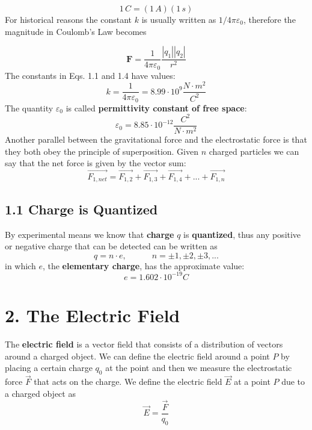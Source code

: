 \documentclass[12pt, a4paper]{article}
\begin{document}
		\begin{equation*}
			1 \, C = (1 \, A)(1 \, s)
		\end{equation*}
		For historical reasons the constant $k$ is usually written as $1/4\pi\varepsilon_0$, therefore the magnitude in Coulomb's Law becomes
		
		\begin{equation}
			\textbf{F} = \frac{1}{4\pi\varepsilon_0} \frac{|q_1||q_2|}{r^2} \tag{Coulomb's Law, 1-4}
		\end{equation}
		The constants in Eqs. 1.1 and 1.4 have values:
		\begin{equation*}
			k = \frac{1}{4\pi\varepsilon_0} = 8.99 \cdot 10^9  \frac{N\cdot m^2}{C^2} 
		\end{equation*}
		The quantity $\varepsilon_0$ is called \textbf{permittivity constant of free space}:
		\begin{equation*}
			\varepsilon_0 = 8.85 \cdot 10^{-12} \frac{C^2}{N\cdot m^2}
		\end{equation*}
		Another parallel between the gravitational force and the electrostatic force is that they both obey the principle of superposition. Given $n$ charged particles we can say that the net force is given by the vector sum:
		\begin{equation*}
			\vec{F_{1,net}} = \vec{F_{1,2}} + \vec{F_{1,3}} + \vec{F_{1,4}} + ... + \vec{F_{1,n}} \tag{1-5}
		\end{equation*}
		
		\subsection*{1.1 Charge is Quantized}
		By experimental means we know that \textbf{charge} $q$ is \textbf{quantized}, thus any positive or negative charge that can be detected can be written as 
		\begin{equation*}
			q = n\cdot e,\quad\quad\quad n = \pm1, \pm2, \pm3,...
		\end{equation*}
		in which $e$, the \textbf{elementary charge}, has the approximate value: 
		\begin{equation*}
			e = 1.602 \cdot 10^{-19} C
		\end{equation*}
	
		
		\section*{2. The Electric Field}
		The \textbf{electric field} is a vector field that consists of a distribution of vectors around a charged object. We can define the electric field around a point $P$ by placing a certain charge $q_0$ at the point and then we measure the electrostatic force $\vec{F}$ that acts on the charge. We define the electric field $\vec{E}$ at a point $P$ due to a charged object as
		\begin{equation*}
			\vec{E} = \frac{\vec{F}}{q_0} \tag{Electric Field 2-1}
		\end{equation*}
		
\end{document}
